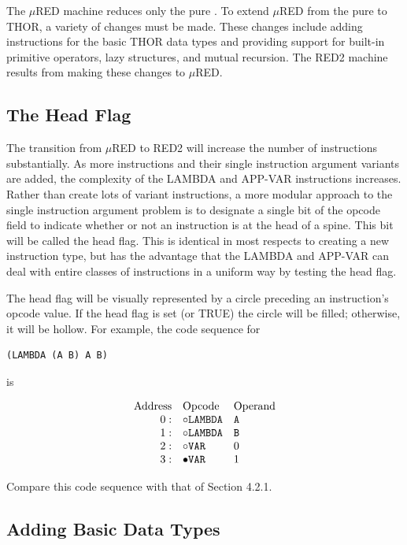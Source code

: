 The \(\mu\)RED machine reduces only the pure \lambdacalculus{}. To extend \(\mu\)RED from the pure \lambdacalculus{} to THOR, a variety of changes must be made. These changes include adding instructions for the basic THOR data types and providing support for built-in primitive operators, lazy structures, and mutual recursion. The RED2 machine results from making these changes to \(\mu\)RED.

\subsection{The Head Flag}

The transition from \(\mu\)RED to RED2 will increase the number of instructions substantially. As more instructions and their single instruction argument variants are added, the complexity of the LAMBDA and APP-VAR instructions increases. Rather than create lots of variant instructions, a more modular approach to the single instruction argument problem is to designate a single bit of the opcode field to indicate whether or not an instruction is at the head of a spine. This bit will be called the head flag. This is identical in most respects to creating a new instruction type, but has the advantage that the LAMBDA and APP-VAR can deal with entire classes of instructions in a uniform way by testing the head flag.

The head flag will be visually represented by a circle preceding an instruction's opcode
value. If the head flag is set (or TRUE) the circle will be filled; otherwise, it will be
hollow. For example, the code sequence for

\begin{verbatim}
(LAMBDA (A B) A B)
\end{verbatim}

is


\[
\begin{array}{rll}
\text{Address} & \text{Opcode} & \text{Operand}\\
0: & \circ\texttt{LAMBDA} & \texttt{A}\\
1: & \circ\texttt{LAMBDA} & \texttt{B}\\
2: & \circ\texttt{VAR} & 0\\
3: & \bullet\texttt{VAR} & 1
\end{array}
\]

Compare this code sequence with that of Section 4.2.1.

\subsection{Adding Basic Data Types}

